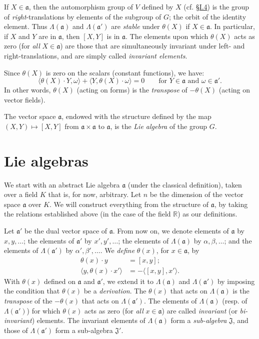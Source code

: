 \documentclass{article}
\newcommand{\RR}{\mathbb{R}}
\newcommand{\fk}{\mathfrak}
\newcommand{\oldpage}[1]{\marginpar{\footnotesize$\Big\vert$ \textit{p.~#1}}}
\begin{document}
If $X\in\fk{a}$, then the automorphism group of $V$ defined by $X$ (cf. \hyperref[I.4]{\S I.4}) is the group of \emph{right}-translations by elements of the subgroup of $G$;
the orbit of the identity element.
Thus $\Lambda(\fk{a})$ and $\Lambda(\fk{a}')$ are \emph{stable} under $\theta(X)$ if $X\in\fk{a}$.
In particular, if $X$ and $Y$ are in $\fk{a}$, then $[X,Y]$ is in $\fk{a}$.
The elements upon which $\theta(X)$ acts as zero (for \emph{all} $X\in\fk{a}$) are those that are simultaneously invariant under left- and right-translations, and are simply called \emph{invariant elements}.

Since $\theta(X)$ is zero on the scalars (constant functions), we have:
\[
\label{equation-I.3}
  \langle \theta(X)\cdot Y,\omega \rangle + \langle Y,\theta(X)\cdot\omega \rangle
  = 0
  \qquad\mbox{for $Y\in\fk{a}$ and $\omega\in\fk{a}'$.}
\tag{3}
\]
In other words, $\theta(X)$ (acting on forms) is the \emph{transpose} of $-\theta(X)$ (acting on vector fields).

The vector space $\fk{a}$, endowed with the structure defined by the map $(X,Y)\mapsto[X,Y]$ from $\fk{a}\times\fk{a}$ to $\fk{a}$, is the \emph{Lie algebra} of the group $G$.


\section{Lie algebras}
\label{I.6}

We start with an abstract Lie algebra $\fk{a}$ (under the classical definition), taken over a field $K$ that is, for now, arbitrary.
Let $n$ be the dimension of the vector space $\fk{a}$ over $K$.
We will construct everything from the structure of $\fk{a}$, by taking the relations established above (in the case of the field $\RR$) as our definitions.

\oldpage{11}
Let $\fk{a}'$ be the dual vector space of $\fk{a}$.
From now on, we denote elements of $\fk{a}$ by $x,y,\ldots$;
the elements of $\fk{a}'$ by $x',y',\ldots$;
the elements of $\Lambda(\fk{a})$ by $\alpha,\beta,\ldots$;
and the elements of $\Lambda(\fk{a}')$ by $\alpha',\beta',\ldots$.
We \emph{define} $\theta(x)$, for $x\in\fk{a}$, by
\[
  \begin{aligned}
    \theta(x)\cdot y
    &= [x,y];
  \\\langle y,\theta(x)\cdot x'\rangle
    &= -\langle[x,y],x'\rangle.
  \end{aligned}
\]
With $\theta(x)$ defined on $\fk{a}$ and $\fk{a}'$, we extend it to $\Lambda(\fk{a})$ and $\Lambda(\fk{a}')$ by imposing the condition that $\theta(x)$ be a \emph{derivation}.
The $\theta(x)$ that acts on $\Lambda(\fk{a})$ is the \emph{transpose} of the $-\theta(x)$ that acts on $\Lambda(\fk{a}')$.
The elements of $\Lambda(\fk{a})$ (resp. of $\Lambda(\fk{a}')$) for which $\theta(x)$ acts as zero (for \emph{all} $x\in\fk{a}$) are called \emph{invariant} (or \emph{bi-invariant}) elements.
The invariant elements of $\Lambda(\fk{a})$ form a \emph{sub-algebra} $\fk{J}$, and those of $\Lambda(\fk{a}')$ form a sub-algebra $\fk{J}'$.
\end{document}
